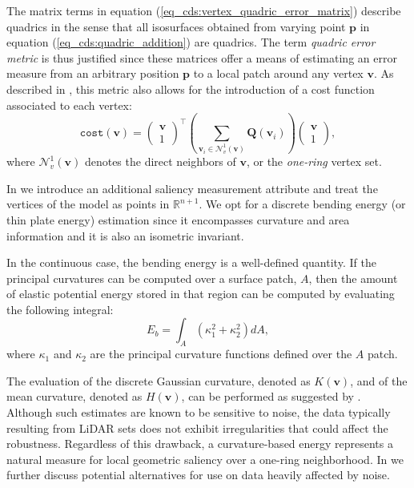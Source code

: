 \documentclass[graybox]{svmult}
\begin{document}
The matrix terms in equation (\ref{eq_cds:vertex_quadric_error_matrix}) describe quadrics in the sense that all isosurfaces obtained from varying point $\mathbf{p}$ in equation (\ref{eq_cds:quadric_addition}) are quadrics. The term \emph{quadric error metric} is thus justified since these matrices offer a means of estimating an error measure from an arbitrary position $\mathbf{p}$ to a local patch around any vertex $\mathbf{v}$. As described in \cite{Cioaca2015}, this metric also allows for the introduction of a cost function associated to each vertex:
\begin{equation}
\mathtt{cost}(\mathbf{v}) = \begin{pmatrix} \mathbf{v} \\ 1 \end{pmatrix}^\intercal \left(\sum\limits_{\mathbf{v}_i \in \mathcal{N}_v^1(\mathbf{v})} { \mathbf{Q}(\mathbf{v}_i)}\right) \begin{pmatrix} \mathbf{v}\\ 1 \end{pmatrix},
\label{eq_cds:vertex_cost}
\end{equation}
where $\mathcal{N}_v^1(\mathbf{v})$ denotes the direct neighbors of $\mathbf{v}$, or the \emph{one-ring} vertex set. 


In \cite{Cioaca2015} we introduce an additional saliency measurement attribute and treat the vertices of the model as points in $\mathbb{R}^{n+1}$. We opt for a discrete bending energy (or thin plate energy)
estimation since it encompasses curvature and area information and it is also an isometric invariant. 

In the continuous case, the bending energy is a well-defined quantity. If the principal curvatures can be computed over a
surface patch, $A$, then the amount of elastic potential energy stored in that region can be computed by evaluating the 
following integral:
\begin{equation}
\label{eq_cds:bendingEnergy}
E_{b} = \int_{A}{\left(\kappa_1^2 + \kappa_2^2\right)}dA,
\end{equation}
where $\kappa_1$ and $\kappa_2$ are the principal curvature functions defined over the $A$ patch.


The evaluation of the discrete Gaussian curvature, denoted as $K(\mathbf{v})$, and  of the mean curvature, denoted as $H(\mathbf{v})$, can be performed as suggested by \cite{Meyer2003}. Although such estimates are known to be sensitive to noise, the data typically resulting from LiDAR sets does not exhibit irregularities that could affect the robustness. Regardless of this drawback, a curvature-based energy represents a natural measure for local geometric saliency over a one-ring neighborhood. In \cite{Cioaca2016, Cioaca2016CEAI} we further discuss potential alternatives for use on data heavily affected by noise.
\end{document}
